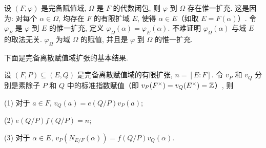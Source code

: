 \begin{remark}
设 $(F,\varphi)$ 是完备赋值域, $\Omega$ 是 $F$ 的代数闭包, 则 $\varphi$ 到 $\Omega$ 存在惟一扩充. 这是因为: 对每个 $\alpha\in\Omega$, 均存在 $F$ 的有限扩域 $E$, 使得 $\alpha\in E$（如取 $E=F(\alpha)$）. 令 $\varphi_E$ 是 $\varphi$ 到 $E$ 的惟一扩充, 定义 $\varphi_\Omega(\alpha)=\varphi_E(\alpha)$. 不难证明 $\varphi_\Omega(\alpha)$ 与域 $E$ 的取法无关. $\varphi_\Omega$ 为域 $\Omega$ 的赋值, 并且是 $\varphi$ 到 $\Omega$ 的惟一扩充.
\end{remark}

下面是完备离散赋值域扩张的基本结果.

\begin{theorem}\label{thm:8.16}
设 $(F,P)\subseteq(E,Q)$ 是完备离散赋值域的有限扩张, $n=[E:F]$. 令 $v_P$ 和 $v_Q$ 分别是素除子 $P$ 和 $Q$ 中的标准指数赋值（即 $v_P(F^{\times})=v_Q(E^{\times})=\mathbb{Z}$）, 则

(1) 对于 $a\in F$, $v_Q(a)=e(Q/P)v_P(a)$;

(2) $e(Q/P)f(Q/P)=n$;

(3) 对于 $\alpha\in E$, $v_P(N_{E/F}(\alpha))=f(Q/P)v_Q(\alpha)$.
\end{theorem}

